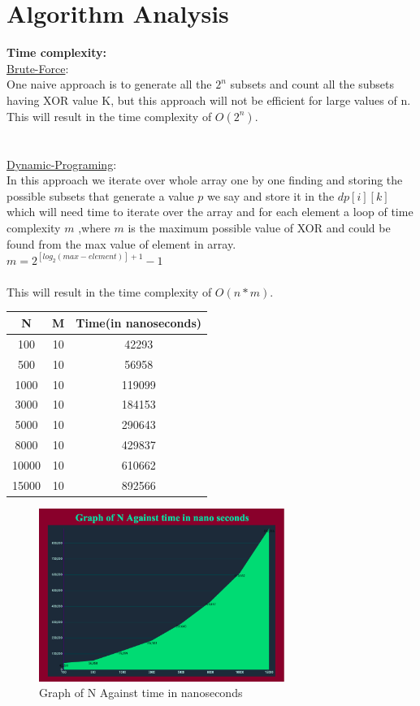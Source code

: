 \documentclass[conference]{IEEEtran}
\begin{document}
\section{Algorithm Analysis}
\textbf{Time complexity:}\\
\underline{Brute-Force}:\\
One naive approach is to generate all the $2^{n}$ subsets and count all the subsets having XOR value K, but this approach will not be efficient for large values of n.\\
This will result in the time complexity of $O(2^{n})$. 
\\\\\\
\underline{Dynamic-Programing}:\\
In this  approach we iterate over whole array one by one finding and storing the possible subsets that generate a value $p$ we say and store it in the $dp[i][k]$ which will need time to iterate over the array and for each element a loop of time complexity $m$ ,where $m$ is the maximum possible value of XOR and could be found from the max value of element in array.\\

\quad $m=2^{[log_2(max-element)] + 1}-1$\\\\
This will result in the time complexity of $O(n*m)$. 
\\
 \begin{center}
 \begin{tabular}{||c| c| c||} 
 \hline
 N & M & Time(in nanoseconds) \\ [0.5ex] 
 \hline\hline
 100 & 10 & 42293  \\ 
 \hline
 500 & 10 & 56958  \\ 
 \hline
 1000 & 10 & 119099  \\ 
 \hline
 3000 & 10 & 184153  \\ 
 \hline
 5000 & 10 & 290643  \\ 
 \hline
 8000 & 10 & 429837  \\ 
 \hline
 10000 & 10 & 610662  \\ 
 \hline
 15000 & 10 & 892566  \\ [1ex] 
  \hline
\end{tabular}
\end{center}

\begin{figure}[h]
\caption{Graph of N Against time in nanoseconds\\}
\centering
\includegraphics[width=8cm]{images/graphn.png}
\end{figure}
\end{document}
